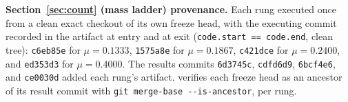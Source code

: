 \textbf{Section~\ref{sec:count} (mass ladder) provenance.} Each rung
executed once from a clean exact checkout of its own freeze head, with the
executing commit recorded in the artifact at entry and at exit
(\texttt{code.start == code.end}, clean tree): \texttt{c6eb85e} for
$\mu = 0.1333$, \texttt{1575a8e} for $\mu = 0.1867$, \texttt{c421dce} for
$\mu = 0.2400$, and \texttt{ed353d3} for $\mu = 0.4000$. The results
commits \texttt{6d3745c}, \texttt{cdfd6d9}, \texttt{6bcf4e6}, and
\texttt{ce0030d} added each rung's artifact.
verifies each freeze head as an ancestor of its result commit with
\texttt{git merge-base -{}-is-ancestor}, per rung.
